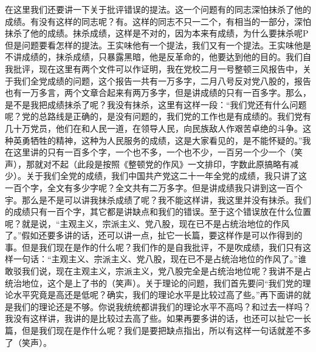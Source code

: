 在这里我们还要讲一下关于批评错误的提法。这一个问题有的同志深怕抹杀了他的成绩。有没有这样的同志呢？有。这样的同志不只一二个，有相当的一部分，深怕抹杀了他的成绩。抹杀成绩，这样是不对的，因为本来有成绩，为什么要抹杀呢P但是问题要看怎样的提法。王实味他有一个提法，我们又有一个提法。王实味他是不讲成绩的，抹杀成绩，只暴露黑暗，他是反革命的，他要达到他的目的。我们自我批评，现在这里有两个文件可以作证明，我在党校二月一号整顿三风报告中，关于我们全党成绩的问题，这个报告一共有一万多字，二月八号反对党八股的，报告也有一万多言，两个文章合起来有两万多字，但是讲成绩的只有一百多字。那么，是不是我把成绩抹杀了呢？我没有抹杀，这里有这样一段：“我们党还有什么问题呢？党的总路线是正确的，是没有问题的，我们党的工作也是有成绩的。我们党有几十万党员，他们在和人民一道，在领导人民，向民族敌人作艰苦卓绝的斗争。这种英勇牺牲的精神，这种为人民服务的成绩，这是大家看见的，是不能怀疑的。”我在这里讲的只有一百多个字，一个也不多，一个也不少，一百另一个少一个（笑声），那就对不起（此段是按照《整顿党的作风》一文排印，字数此原搞略有减少）。关于我们全党的成绩，我们中国共产党这二十一年全党的成绩，我只讲了这一百个字，全文有多少字呢？全文共有二万多字。但是讲成绩我只讲到这一百个宇。那么是不是可以讲我抹杀成绩了呢？我不能这样讲，我这里并没有抹杀。我们的成绩只有一百个字，其它都是讲缺点和我们的错误。至于这个错误放在什么位置呢？就是说，“主观主义，宗派主义、党八股，现在已不是占统治地位的作风了。”假如还要多讲的话，还可以讲一点，扯它一长篇，要这样作是可以作得到的事。但是我们现在是作的什么呢？我们作的是自我批评，不是吹成绩，我们只有这样一句话：“主观主义、宗派主义、党八股，现在已不是占统治地位的作风了。”谁敢驳我们说，现在主观主义，宗派主义，党八股完全是占统治地位呢？我讲不是占统治地位，这个是上了书的（笑声）。关于理论的问题，我们首先要问“我们党的理论水平究竟是高还是低呢？确实，我们的理论水平是比较过高了些。”再下面讲的就是我们的理论还是不够。你说我统统都讲我们的理论水平不高吗？和过去一样吗？我没有这样讲，我讲的是比较过去高了些。如果再要多讲的话，也还可以扯它一长篇，但是我们现在是作什么呢？我们是要把缺点指出，所以有这样一句话就差不多了（笑声）。

